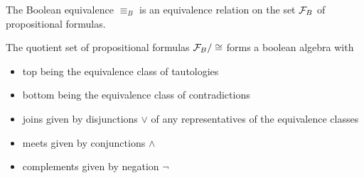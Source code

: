 \begin{proposition}\label{thm:boolean_equivalence_relation}
  The Boolean equivalence $\equiv_B$ is an equivalence relation on the set $\mathcal F_B$ of propositional formulas.
\end{proposition}

\begin{theorem}\label{thm:propositional_logic_boolean_algebra}
  The quotient set of propositional formulas $\mathcal F_B / \cong$ forms a boolean algebra with
  \begin{itemize}
    \item top being the equivalence class of tautologies
    \item bottom being the equivalence class of contradictions
    \item joins given by disjunctions $\lor$ of any representatives of the equivalence classes
    \item meets given by conjunctions $\land$
    \item complements given by negation $\neg$
  \end{itemize}
\end{theorem}
